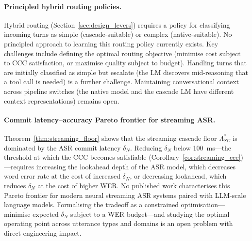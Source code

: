 \paragraph{Principled hybrid routing policies.}
Hybrid routing (Section~\ref{sec:design_levers}) requires a policy for classifying incoming turns as simple (cascade-suitable) or complex (native-suitable).
No principled approach to learning this routing policy currently exists.
Key challenges include defining the optimal routing objective (minimise cost subject to CCC satisfaction, or maximise quality subject to budget).
Handling turns that are initially classified as simple but escalate (the LM discovers mid-reasoning that a tool call is needed) is a further challenge.
Maintaining conversational context across pipeline switches (the native model and the cascade LM have different context representations) remains open.

\paragraph{Commit latency--accuracy Pareto frontier for streaming ASR.}
Theorem~\ref{thm:streaming_floor} shows that the streaming cascade floor $\Lambda^*_{SC}$
is dominated by the ASR commit latency $\delta_N$.
Reducing $\delta_N$ below 100~ms---the threshold at which the CCC becomes satisfiable
(Corollary~\ref{cor:streaming_ccc})---requires increasing the lookahead depth of the ASR
model, which decreases word error rate at the cost of increased $\delta_N$, or decreasing
lookahead, which reduces $\delta_N$ at the cost of higher WER.
No published work characterises this Pareto frontier for modern neural streaming ASR systems
paired with LLM-scale language models.
Formalising the tradeoff as a constrained optimisation---minimise expected $\delta_N$ subject
to a WER budget---and studying the optimal operating point across utterance types and domains
is an open problem with direct engineering impact.

